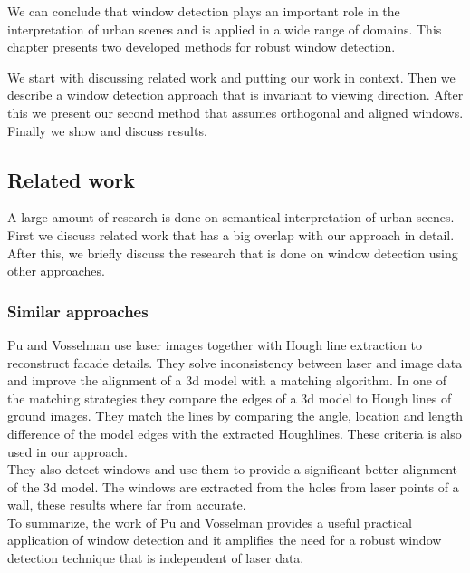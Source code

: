 

We can conclude that window detection plays an important role in the
interpretation of urban scenes and is applied in a wide range of domains.  This
chapter presents two developed methods for robust window detection.

We start with discussing related work and putting our work in context.  Then we
describe a window detection approach that is invariant to viewing direction.
After this we present our second method that assumes orthogonal and aligned
windows.  Finally we show and discuss results. 


\subsection{Related work}
A large amount of research is done on semantical interpretation of urban scenes. First we
discuss related work that has a big overlap with our approach in detail.
After this, we briefly discuss the research that is done on window detection
using other approaches.


\subsubsection{Similar approaches}
Pu and Vosselman \cite{Pu_refiningbuilding}
use laser images together with Hough line extraction to reconstruct facade details.  They solve inconsistency between laser and image data and improve the alignment of a 3d model with a matching algorithm.  In one of the matching strategies they compare the edges of a 3d model to Hough lines of ground images.
They match the lines by comparing the angle, location and length difference of the model edges with the extracted Houghlines.  These criteria is also used in our approach.\\
They also detect windows and use them to provide a significant better alignment of the 3d model.
The windows are extracted from the holes from laser points of a wall, these results where far from accurate.\\
To summarize, the work of Pu and Vosselman provides a useful practical application of window detection and it amplifies the need for a robust window detection technique that is independent of laser data.\\


